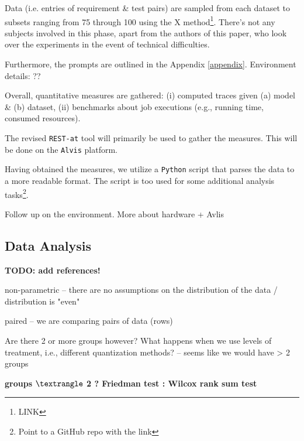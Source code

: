 \documentclass[conference]{IEEEtran}
\begin{document}

Data (i.e. entries of requirement \& test pairs) are sampled from each dataset
to subsets ranging from 75 through 100 using the X method\footnote{LINK}.
There's not any subjects involved in this phase, apart from the authors of this
paper, who look over the experiments in the event of technical difficulties.

Furthermore, the prompts are outlined in the Appendix \ref{appendix}.
Environment details: ??

Overall, quantitative measures are gathered: (i) computed traces given (a) model
\& (b) dataset, (ii) benchmarks about job executions (e.g., running time,
consumed resources).

The revised \verb|REST-at| tool will primarily be used to gather the measures.
This will be done on the \verb|Alvis| platform.

Having obtained the measures, we utilize a \verb|Python| script that parses the
data to a more readable format. The script is too used for some additional 
analysis tasks\footnote{Point to a GitHub repo with the link}. %

Follow up on the environment. More about hardware + Avlis

\subsection{Data Analysis}

\textbf{TODO: add references! \cite{wohlin2012experimentation}}

non-parametric -- there are no assumptions on the distribution of the data / distribution is "even"

paired -- we are comparing pairs of data (rows)

Are there 2 or more groups however? What happens when we use levels of treatment, i.e., different quantization methods? -- seems like we would have > 2 groups
\begin{roundedBox}
\centering
    \textbf{groups $\textrangle$ 2 ? Friedman test : Wilcox rank sum test}  
\end{roundedBox}
\end{document}

